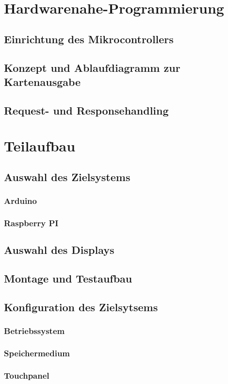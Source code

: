 \section{Hardwarenahe-Programmierung}
\subsection{Einrichtung des Mikrocontrollers}
\subsection{Konzept und Ablaufdiagramm zur Kartenausgabe}
\subsection{Request- und Responsehandling}
\section{Teilaufbau}
\subsection{Auswahl des Zielsystems}
\subsubsection{Arduino}
\subsubsection{Raspberry PI}
\subsection{Auswahl des Displays}
\subsection{Montage und Testaufbau}
\subsection{Konfiguration des Zielsytsems}
\subsubsection{Betriebssystem}
\subsubsection{Speichermedium}
\subsubsection{Touchpanel}
